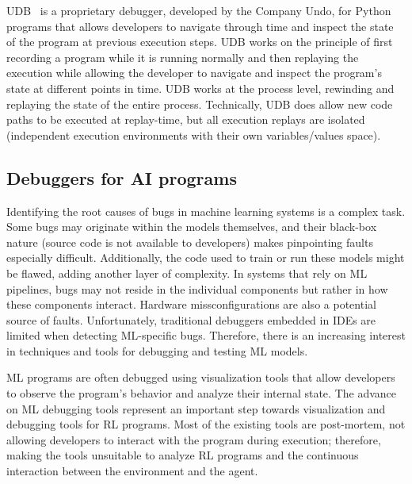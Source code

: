 \ac{UDB}~\cite{udb} is a proprietary debugger, developed by the Company Undo, for Python 
programs that allows developers to navigate through time and inspect the state of the program at  
previous execution steps. \ac{UDB} works on the principle of first recording 
a program while it is running normally and then replaying the execution while allowing the 
developer to navigate and inspect the program's state at different points in time. \ac{UDB} works at 
the process level, rewinding and replaying the state of the entire process. Technically, 
\ac{UDB} does allow new code paths to be executed at replay-time, but all execution replays are 
isolated (\ie independent execution environments with their own variables/values space).

\begin{table}[ht]
	\centering
	\caption{Comparative summary of existing Python debuggers.}
	
	\label{tab:python-debuggers}
\end{table}


\subsection{Debuggers for \ac{AI} programs}
\label{sec:ai}


Identifying the root causes of bugs in machine learning systems is a complex task. Some bugs may 
originate within the models themselves, and their black-box nature (\ie source code is not available to 
developers) makes pinpointing faults especially 
difficult. Additionally, the code used to train or run these models might be flawed, adding another layer 
of complexity. In systems that rely on \ac{ML} pipelines, bugs may not reside in the individual 
components but rather in how these components interact. Hardware missconfigurations are also a 
potential source of faults. Unfortunately, traditional debuggers embedded in IDEs are limited when 
detecting \ac{ML}-specific bugs. Therefore, there is an increasing interest in techniques and tools for 
debugging and testing \ac{ML} models.  

\ac{ML} programs are often debugged using visualization tools that allow developers to observe 
the program's behavior and analyze their internal state. The advance on \ac{ML} debugging tools 
represent an important step towards visualization and debugging tools for \ac{RL} programs.
Most of the existing tools are post-mortem, not allowing developers to interact with the 
program during execution; therefore, making the tools unsuitable to analyze \ac{RL} programs and 
the continuous interaction between the environment and the agent.

